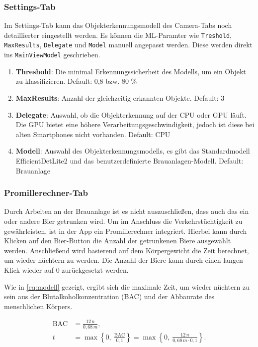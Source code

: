 \subsubsection{Settings-Tab}
Im Settings-Tab kann das Objekterkennungsmodell des Camera-Tabs noch detaillierter eingestellt werden. Es können die ML-Paramter wie \verb|Treshold|, \verb|MaxResults|, \verb|Delegate| und \verb|Model| manuell angepasst werden. Diese werden direkt ins \verb|MainViewModel| geschrieben.
\begin{enumerate}
    \item \textbf{Threshold}: Die minimal Erkennungssicherheit des Modells, um ein Objekt zu klassifizieren. Default: 0,8 bzw. 80 \%
    \item \textbf{MaxResults}: Anzahl der gleichzeitig erkannten Objekte. Default: 3
    \item \textbf{Delegate}: Auswahl, ob die Objekterkennung auf der CPU oder GPU läuft. Die GPU bietet eine höhere Verarbeitungsgeschwindigkeit, jedoch ist diese bei alten Smartphones nicht vorhanden. Default: CPU
    \item \textbf{Modell}: Auswahl des Objekterkennungsmodells, es gibt das Standardmodell EfficientDetLite2 und das benutzerdefinierte Brauanlagen-Modell. Default: Brauanlage
\end{enumerate}


\subsubsection{Promillerechner-Tab}
Durch Arbeiten an der Brauanlage ist es nicht auszuschließen, dass auch das ein oder andere Bier getrunken wird. Um im Anschluss die Verkehrstüchtigkeit zu gewährleisten, ist in der App ein Promillerechner integriert. Hierbei kann durch Klicken auf den \glqq Bier-Button \grqq die Anzahl der getrunkenen Biere ausgewählt werden. Anschließend wird basierend auf dem Körpergewicht die Zeit berechnet, um wieder nüchtern zu werden. Die Anzahl der Biere kann durch einen langen Klick wieder auf 0 zurückgesetzt werden. 

\noindent 
Wie in \autoref{eq:modell} gezeigt, ergibt sich die maximale Zeit, um wieder nüchtern zu sein aus der Blutalkoholkonzentration (BAC) und der Abbaurate des menschlichen Körpers.

\begin{equation}\label{eq:modell}
\begin{aligned}
\mathrm{BAC} &= \frac{12\,n}{0,68\,m},\\
t &= \max\!\left\{0,\ \frac{\mathrm{BAC}}{0,1}\right\}
   = \max\!\left\{0,\ \frac{12\,n}{0,68\,m \cdot 0,1}\right\}.
\end{aligned}
\end{equation}

